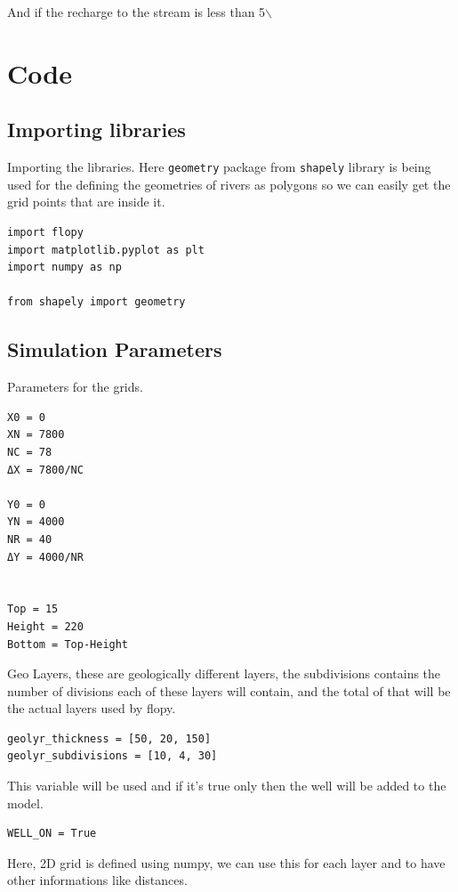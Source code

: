 \documentclass[titlepage,12pt]{unisubmission}
\begin{document}
And if the recharge to the stream is less than 5$\backslash$%

\section{Code}
\label{sec:org1a79e4d}

\subsection{Importing libraries}
\label{sec:org55e89fb}
Importing the libraries. Here \texttt{geometry} package from \texttt{shapely} library is being used for the defining the geometries of rivers as polygons so we can easily get the grid points that are inside it.

\begin{verbatim}
import flopy
import matplotlib.pyplot as plt
import numpy as np

from shapely import geometry
\end{verbatim}

\subsection{Simulation Parameters}
\label{sec:orgfc9d55b}
Parameters for the grids.
\begin{verbatim}
X0 = 0
XN = 7800
NC = 78
ΔX = 7800/NC

Y0 = 0
YN = 4000
NR = 40
ΔY = 4000/NR


Top = 15
Height = 220
Bottom = Top-Height
\end{verbatim}


Geo Layers, these are geologically different layers, the subdivisions contains the number of divisions each of these layers will contain, and the total of that will be the actual layers used by flopy.

\begin{verbatim}
geolyr_thickness = [50, 20, 150]
geolyr_subdivisions = [10, 4, 30]
\end{verbatim}

This variable will be used and if it's true only then the well will be added to the model.

\begin{verbatim}
WELL_ON = True
\end{verbatim}


Here, 2D grid is defined using numpy, we can use this for each layer and to have other informations like distances.
\end{document}
